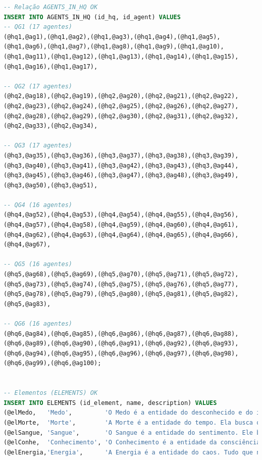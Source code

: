 \documentclass[12pt,a4paper]{report}
\begin{document}
\begin{lstlisting}[language=SQL, caption=population.sql]
-- Relação AGENTS_IN_HQ OK
INSERT INTO AGENTS_IN_HQ (id_hq, id_agent) VALUES
-- QG1 (17 agentes)
(@hq1,@ag1),(@hq1,@ag2),(@hq1,@ag3),(@hq1,@ag4),(@hq1,@ag5),
(@hq1,@ag6),(@hq1,@ag7),(@hq1,@ag8),(@hq1,@ag9),(@hq1,@ag10),
(@hq1,@ag11),(@hq1,@ag12),(@hq1,@ag13),(@hq1,@ag14),(@hq1,@ag15),
(@hq1,@ag16),(@hq1,@ag17),

-- QG2 (17 agentes)
(@hq2,@ag18),(@hq2,@ag19),(@hq2,@ag20),(@hq2,@ag21),(@hq2,@ag22),
(@hq2,@ag23),(@hq2,@ag24),(@hq2,@ag25),(@hq2,@ag26),(@hq2,@ag27),
(@hq2,@ag28),(@hq2,@ag29),(@hq2,@ag30),(@hq2,@ag31),(@hq2,@ag32),
(@hq2,@ag33),(@hq2,@ag34),

-- QG3 (17 agentes)
(@hq3,@ag35),(@hq3,@ag36),(@hq3,@ag37),(@hq3,@ag38),(@hq3,@ag39),
(@hq3,@ag40),(@hq3,@ag41),(@hq3,@ag42),(@hq3,@ag43),(@hq3,@ag44),
(@hq3,@ag45),(@hq3,@ag46),(@hq3,@ag47),(@hq3,@ag48),(@hq3,@ag49),
(@hq3,@ag50),(@hq3,@ag51),

-- QG4 (16 agentes)
(@hq4,@ag52),(@hq4,@ag53),(@hq4,@ag54),(@hq4,@ag55),(@hq4,@ag56),
(@hq4,@ag57),(@hq4,@ag58),(@hq4,@ag59),(@hq4,@ag60),(@hq4,@ag61),
(@hq4,@ag62),(@hq4,@ag63),(@hq4,@ag64),(@hq4,@ag65),(@hq4,@ag66),
(@hq4,@ag67),

-- QG5 (16 agentes)
(@hq5,@ag68),(@hq5,@ag69),(@hq5,@ag70),(@hq5,@ag71),(@hq5,@ag72),
(@hq5,@ag73),(@hq5,@ag74),(@hq5,@ag75),(@hq5,@ag76),(@hq5,@ag77),
(@hq5,@ag78),(@hq5,@ag79),(@hq5,@ag80),(@hq5,@ag81),(@hq5,@ag82),
(@hq5,@ag83),

-- QG6 (16 agentes)
(@hq6,@ag84),(@hq6,@ag85),(@hq6,@ag86),(@hq6,@ag87),(@hq6,@ag88),
(@hq6,@ag89),(@hq6,@ag90),(@hq6,@ag91),(@hq6,@ag92),(@hq6,@ag93),
(@hq6,@ag94),(@hq6,@ag95),(@hq6,@ag96),(@hq6,@ag97),(@hq6,@ag98),
(@hq6,@ag99),(@hq6,@ag100);


-- Elementos (ELEMENTS) OK
INSERT INTO ELEMENTS (id_element, name, description) VALUES
(@elMedo,   'Medo',         'O Medo é a entidade do desconhecido e do infinito. Presente desde os primórdios da humanidade, modifica a natureza do universo. A sua existência diferenciada é um mistério.'),
(@elMorte,  'Morte',        'A Morte é a entidade do tempo. Ela busca os momentos vivenciados, distorcendo a percepção egóica da existência de cada indivíduo para seu próprio agrado. A distorção temporal da Morte arruína a percepção carnal do Sangue.'),
(@elSangue, 'Sangue',       'O Sangue é a entidade do sentimento. Ele busca a intensidade: dor, obsessão, paixão, amor, fome, ódio - tudo que envolve sentir uma emoção extrema agrada a entidade de Sangue. Os sentimentos extremos do Sangue superam a razão e a calmaria do Conhecimento.'),
(@elConhe,  'Conhecimento', 'O Conhecimento é a entidade da consciência. Descobrir, aprender, conhecer, decifrar. Ter a própria percepção do Outro Lado e suas entidades agrada o elemento de Conhecimento. A razão e lógica do Conhecimento reintegram e suprimem o caos da Energia.'),
(@elEnergia,'Energia',      'A Energia é a entidade do caos. Tudo que não pode ser explicado, o intangível, a anarquia. A constante mudança, o calor e o frio, a luz e as trevas. Tudo que envolve a imprevisibilidade e a transformação agrada a entidade de Energia. A transformação da Energia sobrecarrega os efeitos da Morte.');


\end{lstlisting}
\end{document}
